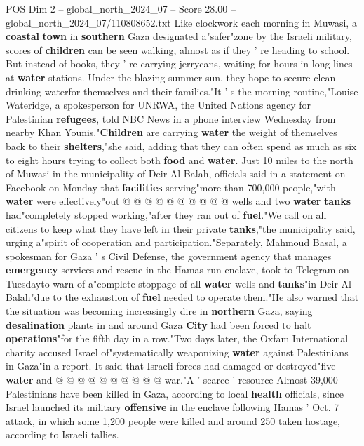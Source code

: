 \begin{textsample}{POS Dim 2 – global\_north\_2024\_07 – Score 28.00 – global\_north\_2024\_07/110808652.txt}  \label{ex:f2_pos_387}
Like clockwork each morning in Muwasi, a \textbf{coastal} \textbf{town} in \textbf{southern} Gaza designated a"safer"zone by the Israeli military, scores of \textbf{children} can be seen walking, almost as if they ' re heading to school.
But instead of books, they ' re carrying jerrycans, waiting for hours in long lines at \textbf{water} stations.
Under the blazing summer sun, they hope to secure clean drinking waterfor themselves and their families."It ' s the morning routine,"Louise Wateridge, a spokesperson for UNRWA, the United Nations agency for Palestinian \textbf{refugees}, told NBC News in a phone interview Wednesday from nearby Khan Younis."\textbf{Children} are carrying \textbf{water} the weight of themselves back to their \textbf{shelters},"she said, adding that they can often spend as much as six to eight hours trying to collect both \textbf{food} and \textbf{water}.
Just 10 miles to the north of Muwasi in the municipality of Deir Al-Balah, officials said in a statement on Facebook on Monday that \textbf{facilities} serving"more than 700,000 people,"with \textbf{water} were effectively"out @ @ @ @ @ @ @ @ @ @ wells and two \textbf{water} \textbf{tanks} had"completely stopped working,"after they ran out of \textbf{fuel}."We call on all citizens to keep what they have left in their private \textbf{tanks},"the municipality said, urging a"spirit of cooperation and participation."Separately, Mahmoud Basal, a spokesman for Gaza ' s Civil Defense, the government agency that manages \textbf{emergency} services and rescue in the Hamas-run enclave, took to Telegram on Tuesdayto warn of a"complete stoppage of all \textbf{water} wells and \textbf{tanks}"in Deir Al-Balah"due to the exhaustion of \textbf{fuel} needed to operate them."He also warned that the situation was becoming increasingly dire in \textbf{northern} Gaza, saying \textbf{desalination} plants in and around Gaza \textbf{City} had been forced to halt \textbf{operations}"for the fifth day in a row."Two days later, the Oxfam International charity accused Israel of"systematically weaponizing \textbf{water} against Palestinians in Gaza"in a report.
It said that Israeli forces had damaged or destroyed"five \textbf{water} and @ @ @ @ @ @ @ @ @ @ war."A ' scarce ' resource Almost 39,000 Palestinians have been killed in Gaza, according to local \textbf{health} officials, since Israel launched its military \textbf{offensive} in the enclave following Hamas ' Oct. 7 attack, in which some 1,200 people were killed and around 250 taken hostage, according to Israeli tallies.

\end{textsample}
